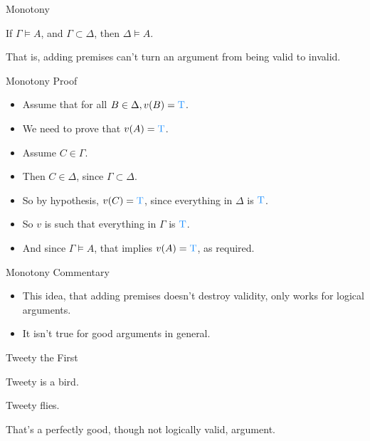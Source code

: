 \documentclass[
  ignorenonframetext,
]{beamer}
\providecommand{\tightlist}{%
  \setlength{\itemsep}{0pt}\setlength{\parskip}{0pt}}
\renewcommand{\,}{\text{, }}
\renewenvironment*{quote}	
	{\list{}{\rightmargin   \leftmargin} \item } 	
	{\endlist }
\newcommand{\DisplayArg}[2]{
\begin{enumerate}
{#1}
\end{enumerate}
\vspace{-6pt}
\hrulefill

\begin{quote}
{\normalfont #2}
\end{quote}
\vspace{12pt}
}
\def\True{\textcolor{dodgerblue}{\text{T}}}
\begin{document}
\begin{frame}{Monotony}
\protect\hypertarget{monotony}{}

\begin{quote}
If \(\Gamma \vDash A\), and \(\Gamma \subset \Delta\), then
\(\Delta \vDash A\).
\end{quote}

That is, adding premises can't turn an argument from being valid to
invalid.

\end{frame}

\begin{frame}{Monotony Proof}
\protect\hypertarget{monotony-proof}{}

\begin{itemize}
\tightlist
\item
  Assume that for all \(B \in \Delta, v(B) = \True\).
\item
  We need to prove that \(v(A) = \True\).\pause
\item
  Assume \(C \in \Gamma\).
\item
  Then \(C \in \Delta\), since \(\Gamma \subset \Delta\).\pause
\item
  So by hypothesis, \(v(C) = \True\), since everything in \(\Delta\) is
  \(\True\).\pause
\item
  So \(v\) is such that everything in \(\Gamma\) is \(\True\).\pause
\item
  And since \(\Gamma \vDash A\), that implies \(v(A) = \True\), as
  required.
\end{itemize}

\end{frame}

\begin{frame}{Monotony Commentary}
\protect\hypertarget{monotony-commentary}{}

\begin{itemize}
\tightlist
\item
  This idea, that adding premises doesn't destroy validity, only works
  for logical arguments.
\item
  It isn't true for good arguments in general.
\end{itemize}

\end{frame}

\begin{frame}{Tweety the First}
\protect\hypertarget{tweety-the-first}{}

\DisplayArg{ \item Tweety is a bird. } { Tweety flies. } \bigskip

That's a perfectly good, though not logically valid, argument.

\end{frame}
\end{document}
